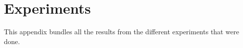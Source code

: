 
\chapter{Experiments} %

This appendix bundles all the results from the different experiments that were done. 

\